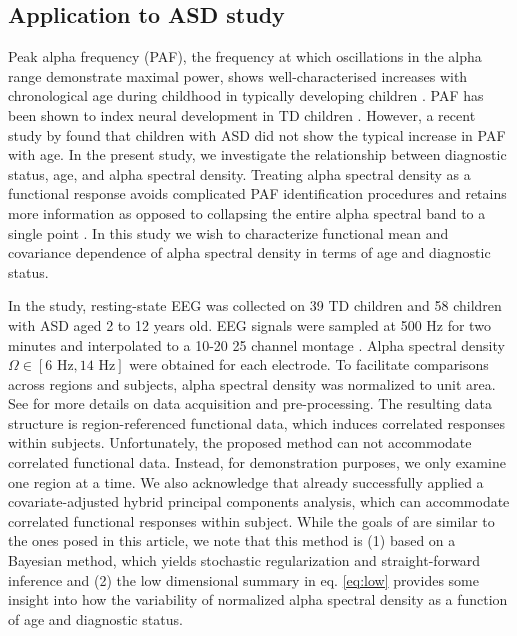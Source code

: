 \documentclass[useAMS,referee,usenatbib]{biom}
\begin{document}
\subsection{Application to ASD study}
Peak alpha frequency (PAF), the frequency at which oscillations in the alpha range demonstrate maximal power, shows well-characterised increases with chronological age during childhood in typically developing children \citep{Somsen1997, Dustman1999, Stroganova1999, Chiang2011, Cragg2011, Miskovic2015}. PAF has been shown to index neural development in TD children \citep{Valdes2010, Segalowitz2010, Rodriguez2017}. However, a recent study by \citet{Dickinson2017} found that children with ASD did not show the typical increase in PAF with age. In the present study, we investigate the relationship between diagnostic status, age, and alpha spectral density. Treating alpha spectral density as a functional response avoids complicated PAF identification procedures \citet{Dickinson2017} and retains more information as opposed to collapsing the entire alpha spectral band to a single point \citep{Scheffler2019, Scheffler2020}. In this study we wish to characterize functional mean and covariance dependence of alpha spectral density in terms of age and diagnostic status. 

In the \citet{Dickinson2017} study, resting-state EEG was collected on 39 TD children and 58 children with ASD aged 2 to 12 years old.  EEG signals were sampled at 500 Hz for two minutes and interpolated to a 10-20 25 channel montage \citep{Jasper1958, Perrin1989}. Alpha spectral density  $\Omega \in [6 \text{ Hz}, 14 \text{ Hz}]$ were obtained for each electrode. To facilitate comparisons across regions and subjects, alpha spectral density was normalized to unit area. See \cite{Scheffler2019} for more details on data acquisition and pre-processing. The resulting data structure is region-referenced functional data, which induces correlated responses within subjects. Unfortunately, the proposed method can not accommodate correlated functional data. Instead, for demonstration purposes, we only examine one region at a time. We also acknowledge that \citet{Scheffler2020} already successfully applied a covariate-adjusted hybrid principal components analysis, which can accommodate correlated functional responses within subject. While the goals of \citet{Scheffler2020} are similar to the ones posed in this article, we note that this method is (1) based on a Bayesian method, which yields stochastic regularization and straight-forward inference and (2) the low dimensional summary in eq. \ref{eq:low} provides some insight into how the variability of normalized alpha spectral density as a function of age and diagnostic status. 
\end{document}
